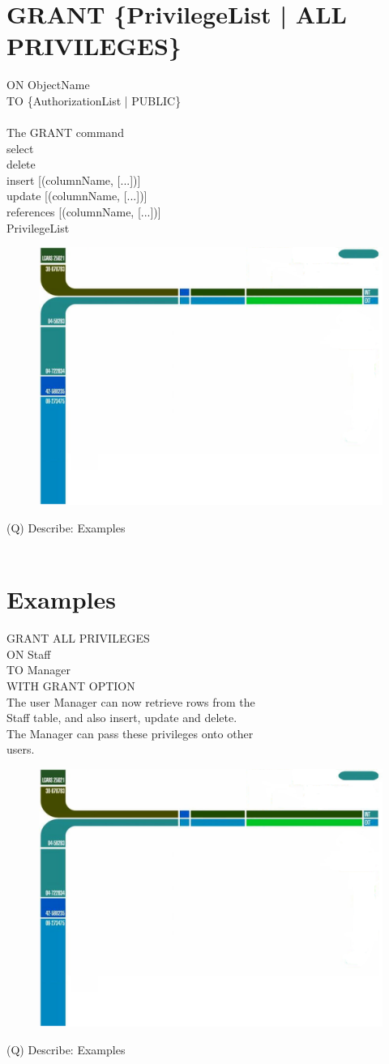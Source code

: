 \documentclass[12pt]{article}
\begin{document}
\section{GRANT \{PrivilegeList | ALL PRIVILEGES\}}
ON ObjectName\\
TO \{AuthorizationList | PUBLIC\}\\
[WITH GRANT OPTION]\\
The GRANT command\\
select\\
delete\\
insert [(columnName, [...])]\\
update [(columnName, [...])]\\
references [(columnName, [...])]\\
PrivilegeList\\
\begin{figure}[H]
\includegraphics[width=0.5\linewidth]{page21-image-1.png}
\end{figure}
\clearpage
(Q)
Describe: Examples
\\ 
 \\
\section{Examples}
GRANT ALL PRIVILEGES\\
ON Staff\\
TO Manager\\
WITH GRANT OPTION\\
The user Manager can now retrieve rows from the \\
Staff table, and also insert, update and delete.\\
The Manager can pass these privileges onto other \\
users.\\
\begin{figure}[H]
\includegraphics[width=0.5\linewidth]{page22-image-1.png}
\end{figure}
\clearpage
(Q)
Describe: Examples
\\ 
 \\
\end{document}
